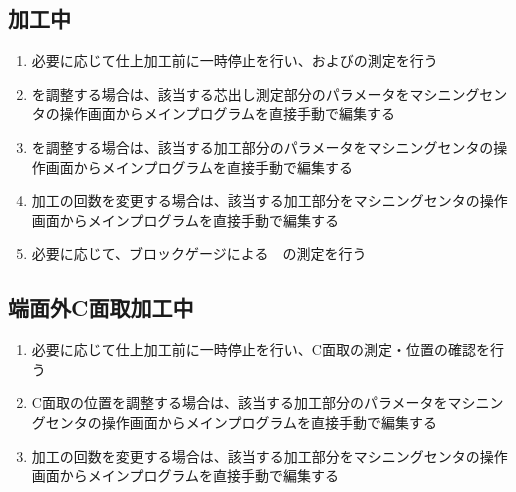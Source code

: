 \subsection{\Keyway 加工中}
\begin{enumerate}
\item 必要に応じて仕上加工前に一時停止を行い、\AsideKeywayDepth および\KeywayDiameter の測定を行う
\item \AsideKeywayDepth を調整する場合は、該当する芯出し測定部分のパラメータをマシニングセンタの操作画面からメインプログラムを直接手動で編集する
\item \KeywayDiameter を調整する場合は、該当する加工部分のパラメータをマシニングセンタの操作画面からメインプログラムを直接手動で編集する
\item {}加工の回数を変更する場合は、該当する加工部分をマシニングセンタの操作画面からメインプログラムを直接手動で編集する
\item 必要に応じて、ブロックゲージによる\KeywayWidth　の測定を行う
\end{enumerate}


\subsection{端面外C面取加工中}
\begin{enumerate}
\item 必要に応じて仕上加工前に一時停止を行い、C面取の測定・位置の確認を行う
\item C面取の位置を調整する場合は、該当する加工部分のパラメータをマシニングセンタの操作画面からメインプログラムを直接手動で編集する
\item {}加工の回数を変更する場合は、該当する加工部分をマシニングセンタの操作画面からメインプログラムを直接手動で編集する
\end{enumerate}


